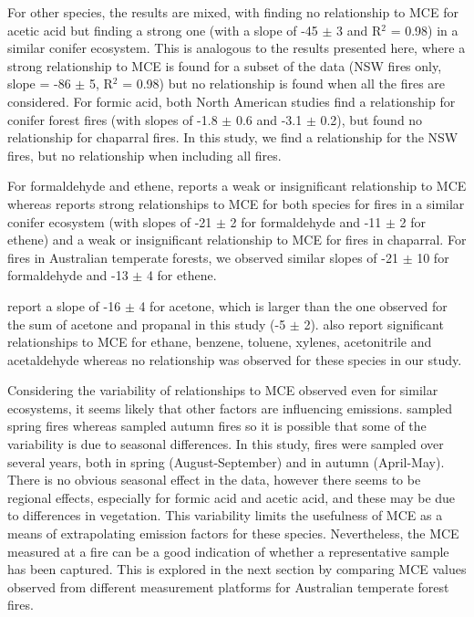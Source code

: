 \documentclass[acp, manuscript]{copernicus}
\begin{document}
For other species, the results are mixed, with \citet{Akagi2013} finding no relationship to MCE for acetic acid but \citet{Burling2011} finding a strong one (with a slope of -45 $\pm$ 3 and R$^2$ = 0.98) in a similar conifer ecosystem. This is analogous to the results presented here, where a strong relationship to MCE is found for a subset of the data (NSW fires only, slope = -86 $\pm$ 5, R$^2$ = 0.98) but no relationship is found when all the fires are considered. 
For formic acid, both North American studies find a relationship for conifer forest fires (with slopes of -1.8 $\pm$ 0.6 and -3.1 $\pm$ 0.2), but \citet{Burling2011} found no relationship for chaparral fires. In this study, we find a relationship for the NSW fires, but no relationship when including all fires. 

For formaldehyde and ethene, \citet{Akagi2013} reports a weak or insignificant relationship to MCE whereas \citet{Burling2011} reports strong relationships to MCE for both species for fires in a similar conifer ecosystem (with slopes of -21 $\pm$ 2 for formaldehyde and -11 $\pm$ 2 for ethene) and a weak or insignificant relationship to MCE for fires in chaparral. For fires in Australian temperate forests, we observed similar slopes of -21 $\pm$ 10 for formaldehyde and -13 $\pm$ 4 for ethene. 

\citet{Akagi2013} report a slope of -16 $\pm$ 4 for acetone, which is larger than the one observed for the sum of acetone and propanal in this study (-5 $\pm$ 2). \citet{Akagi2013} also report significant relationships to MCE for ethane, benzene, toluene, xylenes, acetonitrile and acetaldehyde whereas no relationship was observed for these species in our study.
   
Considering the variability of relationships to MCE observed even for similar ecosystems, it seems likely that other factors are influencing emissions.%
\citet{Burling2011} sampled spring fires whereas \citet{Akagi2013} sampled autumn fires so it is possible that some of the variability is due to seasonal differences. In this study, fires were sampled over several years, both in spring (August-September) and in autumn (April-May). There is no obvious seasonal effect in the data, however there seems to be regional effects, especially for formic acid and acetic acid, and these may be due to differences in vegetation.   
This variability limits the usefulness of MCE as a means of extrapolating emission factors for these species. Nevertheless, the MCE measured at a fire can be a good indication of whether a representative sample has been captured. This is explored in the next section by comparing MCE values observed from different measurement platforms for Australian temperate forest fires. 
\end{document}
